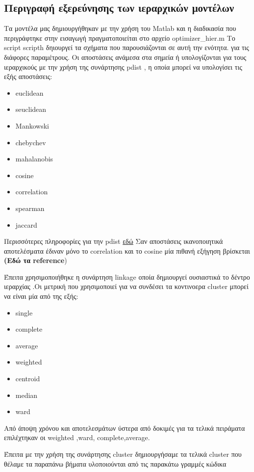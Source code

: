 \subsection{Περιγραφή εξερεύνησης των ιεραρχικών μοντέλων}

Τα μοντέλα μας δημιουργήθηκαν με την χρήση του Matlab και η διαδικασία που περιγράφτηκε στην εισαγωγή πραγματοποιείται στο αρχείο optimizer\_hier.m
Το script scripth δηιουργεί τα σχήματα που παρουσιάζονται σε αυτή την ενότητα.
για τις διάφορες παραμέτρους. Οι αποστάσεις ανάμεσα στα σημεία ή υπολογίζονται για τους ιεραρχικούς με την χρήση της συνάρτησης pdist , η οποία μπορεί να υπολογίσει τις εξής αποστάσεις:
\begin{itemize}
    \item euclidean
    \item seuclidean
    \item Mankowski
    \item chebychev
    \item mahalanobis
    \item cosine
    \item correlation
    \item spearman
    \item jaccard 
\end{itemize}


Περισσότερες πληροφορίες για την pdist \href{http://www.mathworks.com/help/stats/pdist.html}{εδώ}
Σαν αποστάσεις ικανοποιητικά αποτελέσματα έδιναν μόνο το correlation και το 
cosine  μία πιθανή εξήγηση βρίσκεται \textbf{(Εδώ τα reference})

Έπειτα χρησιμοποιήθηκε η συνάρτηση linkage οποία δημιουργεί ουσιαστικά το δέντρο ιεραρχίας .Οι μετρική που χρησιμοποιεί για να συνδέσει τα κοντινοερα cluster μπορεί να είναι μία από της εξής:
\begin{itemize}
    \item single
    \item complete
    \item average
    \item weighted
    \item centroid
    \item median
    \item ward 
  \end{itemize}

Από άποψη χρόνου και αποτελεσμάτων ύστερα από δοκιμές για τα τελικά πειράματα επιλέχτηκαν οι weighted ,ward, complete,average.

Έπειτα με την χρήση της συνάρτησης cluster δημιουργήσαμε τα τελικά cluster που θέλαμε τα παραπάνω βήματα υλοποιούνται από τις παρακάτω γραμμές κώδικα 


